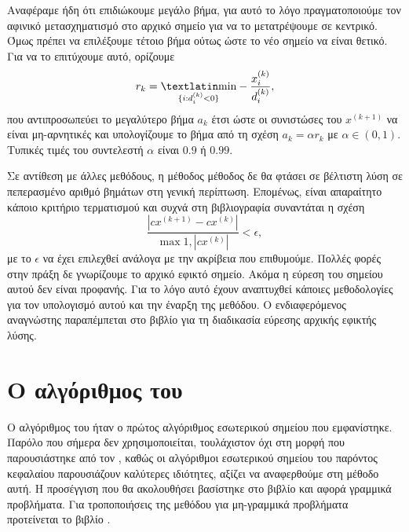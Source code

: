 Αναφέραμε ήδη ότι επιδιώκουμε μεγάλο βήμα, για αυτό το λόγο πραγματοποιούμε τον
αφινικό μετασχηματισμό στο αρχικό σημείο για να το μετατρέψουμε σε κεντρικό.
Όμως πρέπει να επιλέξουμε τέτοιο βήμα ούτως ώστε το νέο σημείο να είναι θετικό.
Για να το επιτύχουμε αυτό, ορίζουμε
\begin{equation*}
    r_k = \underset{\{i: d_i^{(k)} < 0\}} {\text{\tl{min}}}
    -\frac{x^{(k)}_i}{d^{(k)}_i},
\end{equation*}
που αντιπροσωπεύει το μεγαλύτερο βήμα \( a_k \) έτσι ώστε οι συνιστώσες του
\( x^{(k+1)} \) να είναι μη-αρνητικές και υπολογίζουμε το βήμα από τη σχέση
\( a_k = \alpha r_k \) με \( \alpha \in (0, 1) \). Τυπικές τιμές του συντελεστή
\( \alpha \) είναι \(0.9\) ή \(0.99\).

Σε αντίθεση με άλλες μεθόδους, η μέθοδος  μέθοδος δε θα
φτάσει σε βέλτιστη λύση σε πεπερασμένο αριθμό βημάτων στη γενική περίπτωση.
Επομένως, είναι απαραίτητο κάποιο κριτήριο τερματισμού και συχνά στη
βιβλιογραφία συναντάται η σχέση
\begin{equation*}
    \frac{| cx^{(k+1)} - cx^{(k)} |} {\max{1, |cx^{(k)}|}} < \epsilon,
\end{equation*}
με το \( \epsilon \) να έχει επιλεχθεί ανάλογα με την ακρίβεια που επιθυμούμε.
Πολλές φορές στην πράξη δε γνωρίζουμε το αρχικό εφικτό σημείο. Ακόμα η εύρεση
του σημείου αυτού δεν είναι προφανής. Για το λόγο αυτό έχουν αναπτυχθεί κάποιες
μεθοδολογίες για τον υπολογισμό αυτού και την έναρξη της μεθόδου. Ο
ενδιαφερόμενος αναγνώστης παραπέμπεται στο βιβλίο \cite{chong2010} για τη
διαδικασία εύρεσης αρχικής εφικτής λύσης.

\section{Ο αλγόριθμος του }
Ο αλγόριθμος του  ήταν ο πρώτος αλγόριθμος εσωτερικού σημείου που
εμφανίστηκε. Παρόλο που σήμερα δεν χρησιμοποιείται, τουλάχιστον όχι στη μορφή
που παρουσιάστηκε από τον , καθώς οι αλγόριθμοι
εσωτερικού σημείου του παρόντος κεφαλαίου παρουσιάζουν
καλύτερες ιδιότητες, αξίζει να αναφερθούμε στη μέθοδο αυτή. Η προσέγγιση
που θα ακολουθήσει βασίστηκε στο βιβλίο \cite{chong2010} και αφορά γραμμικά
προβλήματα. Για τροποποιήσεις της μεθόδου για μη-γραμμικά προβλήματα προτείνεται
το βιβλίο \cite{nesterov1994interior}.

